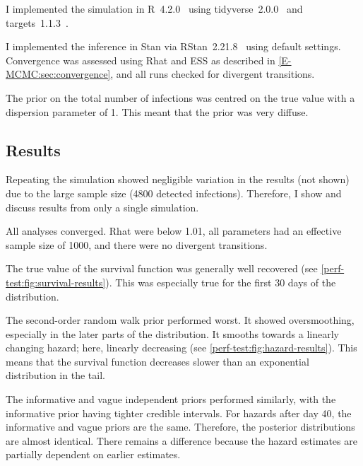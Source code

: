 \documentclass[thesis.tex]{subfiles}
\begin{document}
I implemented the simulation in R~4.2.0~\autocite{R-4-2-0} using tidyverse~2.0.0~\autocite{tidyverse} and targets~1.1.3~\autocite{targetsPackage}.

I implemented the inference in Stan via RStan~2.21.8~\autocite{rstan2-21-8} using default settings.
Convergence was assessed using Rhat and ESS as described in \cref{E-MCMC:sec:convergence}, and all runs checked for divergent transitions.

The prior on the total number of infections was centred on the true value with a dispersion parameter of 1.
This meant that the prior was very diffuse.


\subsection{Results} \label{perf-test:sec:results}

Repeating the simulation showed negligible variation in the results (not shown) due to the large sample size (4800 detected infections).
Therefore, I show and discuss results from only a single simulation.

All analyses converged.
Rhat were below 1.01, all parameters had an effective sample size of 1000, and there were no divergent transitions.

The true value of the survival function was generally well recovered (see \cref{perf-test:fig:survival-results}).
This was especially true for the first 30 days of the distribution.

The second-order random walk prior performed worst.
It showed oversmoothing, especially in the later parts of the distribution.
It smooths towards a linearly changing hazard; here, linearly decreasing (see \cref{perf-test:fig:hazard-results}).
This means that the survival function decreases slower than an exponential distribution in the tail.

The informative and vague independent priors performed similarly, with the informative prior having tighter credible intervals.
For hazards after day 40, the informative and vague priors are the same.
Therefore, the posterior distributions are almost identical.
There remains a difference because the hazard estimates are partially dependent on earlier estimates.
\end{document}
